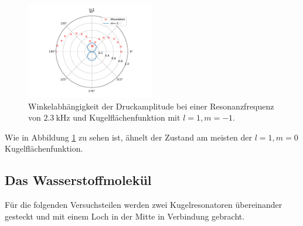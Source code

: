 \begin{figure}
    \centering
    \includegraphics[width=0.5\textwidth]{figure/9mmZwischenring_m-1.pdf}
    \caption{Winkelabhängigkeit der Druckamplitude bei einer Resonanzfrequenz von $\SI{2.3}{\kilo\hertz}$ und Kugelflächenfunktion mit $l=1,m=-1$.}
    \label{fig:9mmZwischenring_n2}
\end{figure}
\FloatBarrier
Wie in Abbildung \ref{fig:9mmZwischenring_n2} zu sehen ist, ähnelt der Zustand am meisten der $l=1,m=0$ Kugelflächenfunktion.

\subsection{Das Wasserstoffmolekül}
Für die folgenden Versuchsteilen werden zwei Kugelresonatoren übereinander gesteckt und mit einem Loch in der Mitte in Verbindung gebracht.

